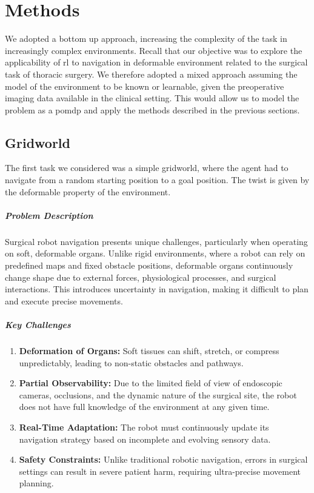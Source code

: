 
\chapter{Methods}
We adopted a bottom up approach, increasing the complexity of the task in increasingly complex environments.
Recall that our objective was to explore the applicability of \gls{rl} to navigation in 
deformable environment related to the surgical task of thoracic surgery.
We therefore adopted a mixed approach assuming the model of the environment to be known or learnable, 
given the preoperative imaging data available in the clinical setting. This would allow us to model 
the problem as a \gls{pomdp} and apply the methods described in the previous sections.

\section{Gridworld}
The first task we considered was a simple gridworld, where the agent had to navigate from a random 
starting position to a goal position. The twist is given by the deformable property of the environment.

\paragraph{Problem Description}
Surgical robot navigation presents unique challenges, particularly when operating on soft, deformable organs. Unlike rigid environments, where a robot can rely on predefined maps and fixed obstacle positions, deformable organs continuously change shape due to external forces, physiological processes, and surgical interactions. This introduces uncertainty in navigation, making it difficult to plan and execute precise movements.

\paragraph{Key Challenges}
\begin{enumerate}
\item \textbf{Deformation of Organs:} Soft tissues can shift, stretch, or compress unpredictably, leading to non-static obstacles and pathways.
\item \textbf{Partial Observability:} Due to the limited field of view of endoscopic cameras, occlusions, and the dynamic nature of the surgical site, the robot does not have full knowledge of the environment at any given time.
\item \textbf{Real-Time Adaptation:} The robot must continuously update its navigation strategy based on incomplete and evolving sensory data.
\item \textbf{Safety Constraints:} Unlike traditional robotic navigation, errors in surgical settings can result in severe patient harm, requiring ultra-precise movement planning.
\end{enumerate}


